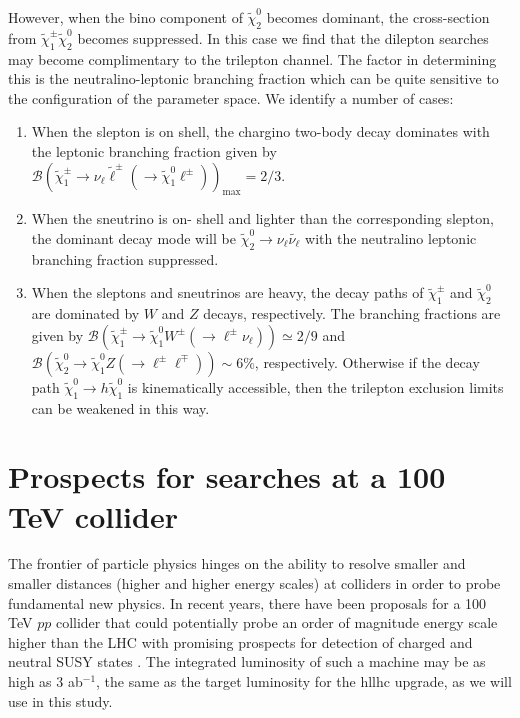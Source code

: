 However, when the bino component of $\tilde{\chi}^0_2$ becomes dominant, the cross-section from $\tilde{\chi}^{\pm}_1 \tilde{\chi}^0_2$ becomes suppressed. In this case we find that the dilepton searches may become complimentary to the trilepton channel. The factor in determining this is the neutralino-leptonic branching fraction which can be quite sensitive to the configuration of the parameter space. We identify a number of cases:
\begin{enumerate}[label=(\alph*)]
\item When the slepton is on shell, the chargino two-body decay dominates with the leptonic branching fraction given by $\mathcal{B}(\tilde{\chi}^{\pm}_1 \rightarrow \nu_{\ell} \tilde{\ell}^{\pm} (\rightarrow \tilde{\chi}^0_1 \ell^{\pm}))_{\text{max}}=2/3$.
\item When the sneutrino is on-	shell and lighter than the corresponding slepton, the dominant decay mode will be $\tilde{\chi}^0_2 \rightarrow \nu_{\ell} \tilde{\nu_{\ell}}$ with the neutralino leptonic branching fraction suppressed.
\item When the sleptons and sneutrinos are heavy, the decay paths of $\tilde{\chi}^{\pm}_1$ and $\tilde{\chi}^0_2$ are dominated by $W$ and $Z$ decays, respectively. The branching fractions are given by $\mathcal{B}(\tilde{\chi}^{\pm}_1 \rightarrow \tilde{\chi}^0_1 W^{\pm} (\rightarrow \ell^{\pm} \nu_{\ell})) \simeq 2/9$ and $\mathcal{B}(\tilde{\chi}^0_2 \rightarrow \tilde{\chi}^0_1 Z (\rightarrow \ell^{\pm} \ell^{\mp})) \sim 6\%$, respectively. Otherwise if the decay path $\tilde{\chi}^0_1 \rightarrow h \tilde{\chi}^0_1$ is kinematically accessible, then the trilepton exclusion limits can be weakened  in this way.
\end{enumerate}

\section{Prospects for searches at a 100 TeV collider}

The frontier of particle physics hinges on the ability to resolve smaller and smaller distances (higher and higher energy scales) at colliders in order to probe fundamental new physics. In recent years, there have been proposals for a 100 TeV $pp$ collider that could potentially probe an order of magnitude energy scale higher than the LHC \cite{RN619} with promising prospects for detection of charged and neutral SUSY states \cite{RN194,RN195}. The integrated luminosity of such a machine may be as high as 3 ab$^{-1}$, the same as the target luminosity for the \acrshort{hllhc} upgrade, as we will use in this study.

